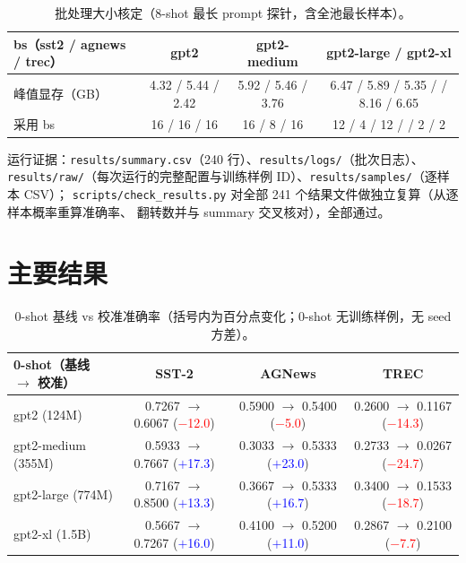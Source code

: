 \documentclass[11pt,a4paper]{ctexart}
\begin{document}
\begin{table}[h]\centering\small
\begin{tabular}{lccc}
\toprule
bs（sst2 / agnews / trec） & gpt2 & gpt2-medium & gpt2-large \quad / \quad gpt2-xl \\
\midrule
峰值显存（GB） & 4.32 / 5.44 / 2.42 & 5.92 / 5.46 / 3.76 & 6.47 / 5.89 / 5.35 \quad / \quad 7.04 / 8.16 / 6.65 \\
采用 bs & 16 / 16 / 16 & 16 / 8 / 16 & 12 / 4 / 12 \quad / \quad 2 / 2 / 2 \\
\bottomrule
\end{tabular}
\caption{批处理大小核定（8-shot 最长 prompt 探针，含全池最长样本）。}
\label{tab:bs}
\end{table}

运行证据：\texttt{results/summary.csv}（240 行）、\texttt{results/logs/}（批次日志）、
\texttt{results/raw/}（每次运行的完整配置与训练样例 ID）、\texttt{results/samples/}（逐样本 CSV）；
\texttt{scripts/check\_results.py} 对全部 241 个结果文件做独立复算（从逐样本概率重算准确率、
翻转数并与 summary 交叉核对），全部通过。

\section{主要结果}

\begin{table}[h]\centering\small
\begin{tabular}{lccc}
\toprule
0-shot（基线 $\rightarrow$ 校准） & SST-2 & AGNews & TREC \\
\midrule
gpt2 (124M)        & 0.7267 $\rightarrow$ 0.6067 (\textcolor{red}{$-$12.0}) & 0.5900 $\rightarrow$ 0.5400 (\textcolor{red}{$-$5.0}) & 0.2600 $\rightarrow$ 0.1167 (\textcolor{red}{$-$14.3}) \\
gpt2-medium (355M) & 0.5933 $\rightarrow$ 0.7667 (\textcolor{blue}{$+$17.3}) & 0.3033 $\rightarrow$ 0.5333 (\textcolor{blue}{$+$23.0}) & 0.2733 $\rightarrow$ 0.0267 (\textcolor{red}{$-$24.7}) \\
gpt2-large (774M)  & 0.7167 $\rightarrow$ 0.8500 (\textcolor{blue}{$+$13.3}) & 0.3667 $\rightarrow$ 0.5333 (\textcolor{blue}{$+$16.7}) & 0.3400 $\rightarrow$ 0.1533 (\textcolor{red}{$-$18.7}) \\
gpt2-xl (1.5B)     & 0.5667 $\rightarrow$ 0.7267 (\textcolor{blue}{$+$16.0}) & 0.4100 $\rightarrow$ 0.5200 (\textcolor{blue}{$+$11.0}) & 0.2867 $\rightarrow$ 0.2100 (\textcolor{red}{$-$7.7}) \\
\bottomrule
\end{tabular}
\caption{0-shot 基线 vs 校准准确率（括号内为百分点变化；0-shot 无训练样例，无 seed 方差）。}
\label{tab:zeroshot}
\end{table}
\end{document}
